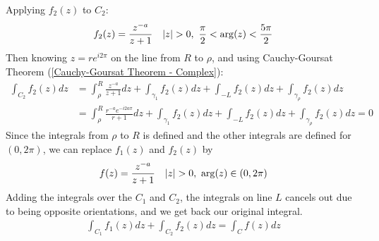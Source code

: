 \documentclass[12pt, english]{book}
\makeatletter
\renewenvironment{proof}[1][\proofname]{\par
	\pushQED{\qed}%
	\normalfont \topsep6\p@\@plus6\p@\relax
	\list{}{%
		\settowidth{\leftmargin}{\itshape\proofname:\hskip\labelsep}%
		\setlength{\labelwidth}{0pt}%
		\setlength{\itemindent}{-\leftmargin}%
	}%
	\item[\hskip\labelsep\itshape#1\@addpunct{:}]\ignorespaces
	}{ \popQED\endlist\@endpefalse}
\makeatother
\begin{document}
\begin{example}
\begin{proof}
{				Applying \(f_2 (z)\) to \(C_2\):
				\begin{align*}
					f_2 (z) &= \frac{z^{-a}}{z+1}
					& \abs{z}>0, \ \frac{\pi}{2} < \arg(z) < \frac{5\pi}{2}
				\end{align*}
				Then knowing \(z = re^{i2\pi}\) on the line from \(R\) to \(\rho\), and using Cauchy-Goursat Theorem (\cref{Cauchy-Goursat Theorem - Complex}):
				\begin{align*}
					\int_{C_2} f_2 (z) dz 
					&= \int_{\rho}^{R} \frac{z^{-a}}{z+1} dz + \int_{\gamma_1} f_2 (z) dz
					+ \int_{-L} f_2 (z) dz + \int_{\gamma_\rho} f_2 (z) dz \\
					&= \int_{\rho}^{R} \frac{r^{-a}e^{-i2a\pi}}{r+1} dz + \int_{\gamma_1} f_2 (z) dz
					+ \int_{-L} f_2 (z) dz + \int_{\gamma_\rho} f_2 (z) dz 
					= 0
				\end{align*}
				Since the integrals from \(\rho\) to \(R\) is defined and the other integrals are defined for \((0,2\pi)\), we can replace \(f_1 (z)\) and \(f_2 (z)\) by
				\begin{align*}
					f(z) &= \frac{z^{-a}}{z+1}	& \abs{z}>0, \ \arg(z) \in (0, 2\pi)
				\end{align*}
				Adding the integrals over the \(C_1\) and \(C_2\), the integrals on line \(L\) cancels out due to being opposite orientations, and we get back our original integral. 
				\begin{align*}
					\int_{C_1} f_1 (z) dz + \int_{C_2} f_2 (z) dz = \int_{C} f(z) dz 
				\end{align*}
			}
		\end{proof}
		 
		\begin{figure}[H]
		 	\centering
\end{figure}
\end{example}
\end{document}
